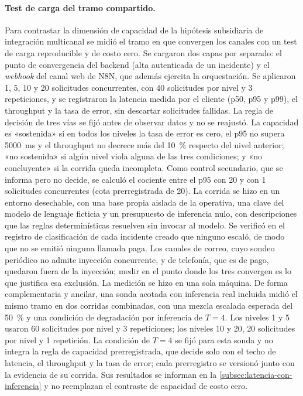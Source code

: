 \paragraph{Test de carga del tramo compartido.} Para contrastar la dimensión de capacidad de la hipótesis subsidiaria de integración multicanal se midió el tramo en que convergen los canales con un test de carga reproducible y de costo cero. Se cargaron dos capas por separado: el punto de convergencia del backend (alta autenticada de un incidente) y el \emph{webhook} del canal web de N8N, que además ejercita la orquestación. Se aplicaron 1, 5, 10 y 20 solicitudes concurrentes, con 40 solicitudes por nivel y 3 repeticiones, y se registraron la latencia medida por el cliente (p50, p95 y p99), el throughput y la tasa de error, sin descartar solicitudes fallidas. La regla de decisión de tres vías se fijó antes de observar datos y no se reajustó. La capacidad es «sostenida» si en todos los niveles la tasa de error es cero, el p95 no supera 5000~ms y el throughput no decrece más del 10~\% respecto del nivel anterior; «no sostenida» si algún nivel viola alguna de las tres condiciones; y «no concluyente» si la corrida queda incompleta. Como control secundario, que se informa pero no decide, se calculó el cociente entre el p95 con 20 y con 1 solicitudes concurrentes (cota prerregistrada de 20). La corrida se hizo en un entorno desechable, con una base propia aislada de la operativa, una clave del modelo de lenguaje ficticia y un presupuesto de inferencia nulo, con descripciones que las reglas determinísticas resuelven sin invocar al modelo. Se verificó en el registro de clasificación de cada incidente creado que ninguno escaló, de modo que no se emitió ninguna llamada paga. Los canales de correo, cuyo sondeo periódico no admite inyección concurrente, y de telefonía, que es de pago, quedaron fuera de la inyección; medir en el punto donde los tres convergen es lo que justifica esa exclusión. La medición se hizo en una sola máquina. De forma complementaria y ancilar, una sonda acotada con inferencia real incluida midió el mismo tramo en dos corridas combinadas, con una mezcla escalada esperada del 50~\% y una condición de degradación por inferencia de $T = 4$. Los niveles 1 y 5 usaron 60 solicitudes por nivel y 3 repeticiones; los niveles 10 y 20, 20 solicitudes por nivel y 1 repetición. La condición de $T = 4$ se fijó para esta sonda y no integra la regla de capacidad prerregistrada, que decide solo con el techo de latencia, el throughput y la tasa de error; cada prerregistro se versionó junto con la evidencia de su corrida. Sus resultados se informan en la \autoref{subsec:latencia-con-inferencia} y no reemplazan el contraste de capacidad de costo cero.

